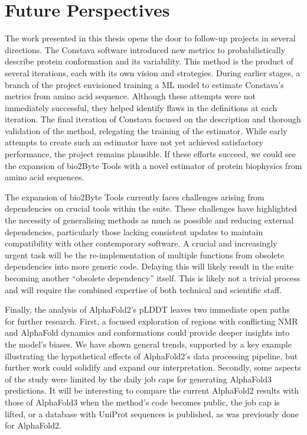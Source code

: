 \section{Future Perspectives}

The work presented in this thesis opens the door to follow-up projects in several directions. The Constava software introduced new metrics to probabilistically describe protein conformation and its variability. This method is the product of several iterations, each with its own vision and strategies. During earlier stages, a branch of the project envisioned training a ML model to estimate Constava's metrics from amino acid sequence. Although these attempts were not immediately successful, they helped identify flaws in the definitions at each iteration. The final iteration of Constava focused on the description and thorough validation of the method, relegating the training of the estimator. While early attempts to create such an estimator have not yet achieved satisfactory performance, the project remains plausible. If these efforts succeed, we could see the expansion of bio2Byte Tools with a novel estimator of protein biophysics from amino acid sequences.

The expansion of bio2Byte Tools currently faces challenges arising from dependencies on crucial tools within the suite. These challenges have highlighted the necessity of generalising methods as much as possible and reducing external dependencies, particularly those lacking consistent updates to maintain compatibility with other contemporary software. A crucial and increasingly urgent task will be the re-implementation of multiple functions from obsolete dependencies into more generic code. Delaying this will likely result in the suite becoming another ``obsolete dependency'' itself. This is likely not a trivial process and will require the combined expertise of both technical and scientific staff.

Finally, the analysis of AlphaFold2's pLDDT leaves two immediate open paths for further research. First, a focused exploration of regions with conflicting NMR and AlphaFold \gls{dynamics} and conformations could provide deeper insights into the model's biases. We have shown general trends, supported by a key example illustrating the hypothetical effects of AlphaFold2's data processing pipeline, but further work could solidify and expand our interpretation. Secondly, some aspects of the study were limited by the daily job caps for generating AlphaFold3 predictions. It will be interesting to compare the current AlphaFold2 results with those of AlphaFold3 when the method's code becomes public, the job cap is lifted, or a database with UniProt sequences is published, as was previously done for AlphaFold2.


